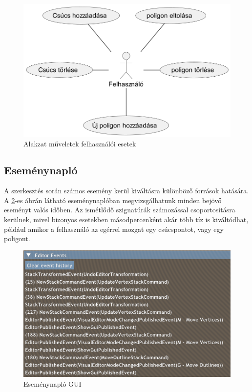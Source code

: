 \begin{figure}[H]
    \centering
    \includegraphics[width=.6\linewidth]{images/usecase_polygon_actions.png}
    \caption{Alakzat műveletek felhasználói esetek}
    \label{fig:usecase_polygon_actions-1}
\end{figure}

\subsection{Eseménynapló}

A szerkesztés során számos esemény kerül kiváltásra különböző források hatására. A \ref{fig:editor_events-1}-es ábrán látható eseménynaplóban megvizsgálhatunk minden bejövő eseményt valós időben. Az ismétlődő szignatúrák számozással csoportosításra kerülnek, mivel bizonyos esetekben másodpercenként akár több tíz is kiváltódhat, például amikor a felhasználó az egérrel mozgat egy csúcspontot, vagy egy poligont.

\begin{figure}[H]
    \centering
    \includegraphics[width=1\linewidth]{images/editor_events.png}
    \caption{Eseménynapló GUI}
    \label{fig:editor_events-1}
\end{figure}


